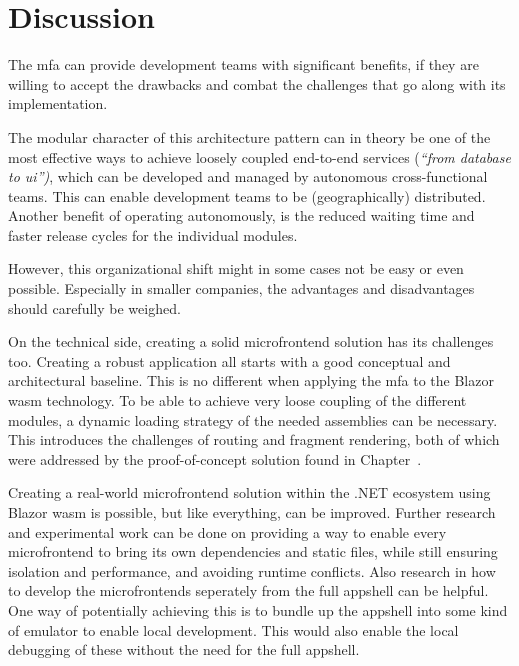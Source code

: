 
\chapter{Discussion}
\label{ch:discussion}


The \gls{mfa} can provide development teams with significant benefits, if they
are willing to accept the drawbacks and combat the challenges that go along with
its implementation. 

The modular character of this architecture pattern can in theory be one of the
most effective ways to achieve loosely coupled end-to-end services
(\textit{``from database to \gls{ui}'')}, which can be developed and managed by
autonomous cross-functional teams. This can enable development teams to be
(geographically) distributed. Another benefit of operating autonomously, is the
reduced waiting time and faster release cycles for the individual modules.

However, this organizational shift might in some cases not be easy or even
possible. Especially in smaller companies, the advantages and disadvantages
should carefully be weighed.

On the technical side, creating a solid \gls{microfrontend} solution has its
challenges too. Creating a robust application all starts with a good conceptual
and architectural baseline. This is no different when applying the \gls{mfa} to
the Blazor \gls{wasm} technology. To be able to achieve very loose coupling of
the different modules, a dynamic loading strategy of the needed assemblies can
be necessary. This introduces the challenges of routing and fragment rendering,
both of which were addressed by the proof-of-concept solution found in
Chapter~.

Creating a real-world \gls{microfrontend} solution within the .NET ecosystem
using Blazor \gls{wasm} is possible, but like everything, can be improved.
Further research and experimental work can be done on providing a way to enable
every microfrontend to bring its own dependencies and static files, while still
ensuring isolation and performance, and avoiding runtime conflicts. Also
research in how to develop the microfrontends seperately from the full
\gls{appshell} can be helpful. One way of potentially achieving this is to
bundle up the \gls{appshell} into some kind of emulator to enable local
development. This would also enable the local debugging of these
 without the need for the full \gls{appshell}.

